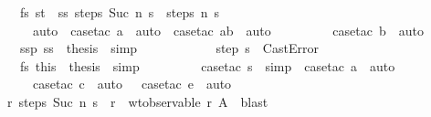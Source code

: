 \begin{isabellebody}
\ \ \ \ \ \ \isamarkupfalse \ fs\ st\ \isamarkupfalse \ ss{\isacharcolon}\ {\isachardoublequoteopen}steps\ {\isacharparenleft}Suc\ n{\isacharparenright}\ s\ {\isacharequal}\ steps\ n\ s{\isacharprime}{\isachardoublequoteclose}\isanewline
\ \ \ \ \ \ \ \ \isamarkupfalse \ auto\ \isamarkupfalse \ {\isacharparenleft}case{\isacharunderscore}tac\ a{\isacharparenright}\ \isamarkupfalse \ auto\ \isamarkupfalse \ {\isacharparenleft}case{\isacharunderscore}tac\ ab{\isacharparenright}\ \isamarkupfalse \ auto\isanewline
\ \ \ \ \ \ \ \ \isamarkupfalse \ {\isacharparenleft}case{\isacharunderscore}tac\ b{\isacharparenright}\ \isamarkupfalse \ auto\ \isamarkupfalse \isanewline
\ \ \ \ \ \ \isamarkupfalse \ ssp\ ss\ \isamarkupfalse \ {\isacharquery}thesis\ \isamarkupfalse \ simp\isanewline
\ \ \ \ \isamarkupfalse \isanewline
\ \ \ \ \ \ \isamarkupfalse \ {\isachardoublequoteopen}step\ s\ {\isacharequal}\ CastError{\isachardoublequoteclose}\isanewline
\ \ \ \ \ \ \isamarkupfalse \ fs\ this\ \isamarkupfalse \ {\isacharquery}thesis\ \isamarkupfalse \ simp\isanewline
\ \ \ \ \ \ \ \ \isamarkupfalse \ {\isacharparenleft}case{\isacharunderscore}tac\ s{\isacharparenright}\ \isamarkupfalse \ simp\ \isamarkupfalse \ {\isacharparenleft}case{\isacharunderscore}tac\ a{\isacharparenright}\ \isamarkupfalse \ auto\isanewline
\ \ \ \ \ \ \ \ \isamarkupfalse \ {\isacharparenleft}case{\isacharunderscore}tac\ c{\isacharparenright}\ \isamarkupfalse \ auto\ \ \isamarkupfalse \ {\isacharparenleft}case{\isacharunderscore}tac\ e{\isacharparenright}\ \isamarkupfalse \ auto\ \isamarkupfalse \isanewline
\ \ \ \ \isamarkupfalse \isanewline
\ \ \isacommand{{\isacharbraceright}}\isamarkupfalse \ \isamarkupfalse \ \isamarkupfalse \ {\isachardoublequoteopen}{\isasymexists}r{\isachardot}\ steps\ {\isacharparenleft}Suc\ n{\isacharparenright}\ s\ {\isacharequal}\ r\ {\isasymand}\ wt{\isacharunderscore}observable\ r\ A{\isachardoublequoteclose}\ \isamarkupfalse \ blast\isanewline
{}\isamarkupfalse \endisatagproof
{\isafoldproof}\isadelimproof
\isanewline

\end{isabellebody}
